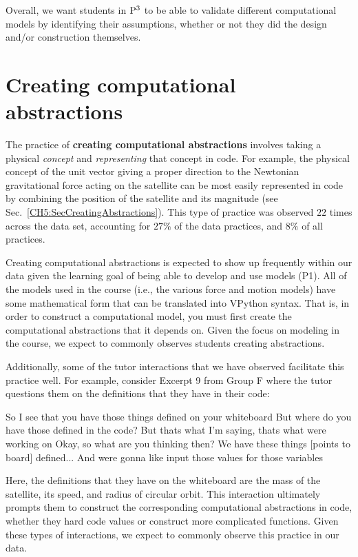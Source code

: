 \documentclass{msuphddissertation}
\begin{document}
\begin{doublespace}
\begin{appendices}
Overall, we want students in ${\rm P}^{3}$ to be able to validate different computational models by identifying their assumptions, whether or not they did the design and/or construction themselves.

\section*{Creating computational abstractions}

The practice of \textbf{creating computational abstractions} involves taking a physical \textit{concept} and \textit{representing} that concept in code.  For example, the physical concept of the unit vector giving a proper direction to the Newtonian gravitational force acting on the satellite can be most easily represented in code by combining the position of the satellite and its magnitude (see Sec.~\ref{CH5:SecCreatingAbstractions}).  This type of practice was observed $22$ times across the data set, accounting for $27\%$ of the data practices, and $8\%$ of all practices.

Creating computational abstractions is expected to show up frequently within our data given the learning goal of being able to develop and use models (P1).  All of the models used in the course (i.e., the various force and motion models) have some mathematical form that can be translated into VPython syntax.  That is, in order to construct a computational model, you must first create the computational abstractions that it depends on.  Given the focus on modeling in the course, we expect to commonly observes students creating abstractions.

Additionally, some of the tutor interactions that we have observed facilitate this practice well.  For example, consider Excerpt 9 from Group F where the tutor questions them on the definitions that they have in their code: \begin{description}
\TA So I see that you have those things defined on your whiteboard
\TA But where do you have those defined in the code?
\SA But thats what I'm saying, thats what were working on
\TA Okay, so what are you thinking then?
\SA We have these things [points to board] defined...
\SA And were gonna like input those values for those {variables}
\end{description}  Here, the definitions that they have on the whiteboard are the mass of the satellite, its speed, and radius of circular orbit.  This interaction ultimately prompts them to construct the corresponding computational abstractions in code, whether they hard code values or construct more complicated functions.  Given these types of interactions, we expect to commonly observe this practice in our data.


\end{appendices}
\end{doublespace}
\end{document}
